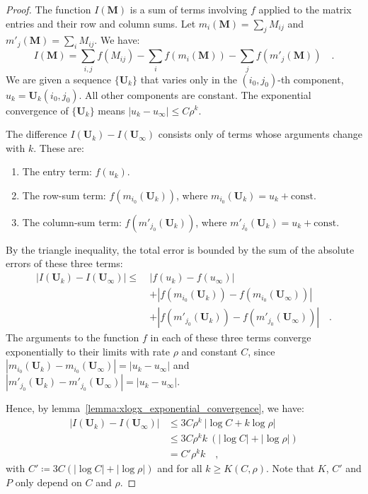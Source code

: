 \documentclass[../../main.tex]{subfiles}
\begin{document}
\begin{proof}
The function $I(\bm{M})$ is a sum of terms involving $f$ applied to the matrix entries and their row and column sums. Let $m_i(\bm{M}) = \sum_j M_{ij}$ and $m'_j(\bm{M}) = \sum_i M_{ij}$. We have:
\[
    I(\bm{M}) = \sum_{i,j} f(M_{ij}) - \sum_i f(m_i(\bm{M})) - \sum_j f(m'_j(\bm{M})) \quad .
\]
We are given a sequence $\{\bm{U}_k\}$ that varies only in the $(i_0, j_0)$-th component, $u_k = \bm{U}_k(i_0, j_0)$. All other components are constant. The exponential convergence of $\{\bm{U}_k\}$ means $|u_k - u_\infty| \le C \rho^k$.

The difference $I(\bm{U}_k) - I(\bm{U}_\infty)$ consists only of terms whose arguments change with $k$. These are:
\begin{enumerate}
    \item The entry term: $f(u_k)$.
    \item The row-sum term: $f(m_{i_0}(\bm{U}_k))$, where $m_{i_0}(\bm{U}_k) = u_k + \text{const}$.
    \item The column-sum term: $f(m'_{j_0}(\bm{U}_k))$, where $m'_{j_0}(\bm{U}_k) = u_k + \text{const}$.
\end{enumerate}
By the triangle inequality, the total error is bounded by the sum of the absolute errors of these three terms:
\begin{align*}
|I(\bm{U}_k) - I(\bm{U}_\infty)| \le \ & |f(u_k) - f(u_\infty)| \\
& + |f(m_{i_0}(\bm{U}_k)) - f(m_{i_0}(\bm{U}_\infty))| \\
& + |f(m'_{j_0}(\bm{U}_k)) - f(m'_{j_0}(\bm{U}_\infty))| \quad .
\end{align*}
The arguments to the function $f$ in each of these three terms converge exponentially to their limits with rate $\rho$ and constant $C$, since $|m_{i_0}(\bm{U}_k) - m_{i_0}(\bm{U}_\infty)| = |u_k - u_\infty|$ and $|m'_{j_0}(\bm{U}_k) - m'_{j_0}(\bm{U}_\infty)| = |u_k - u_\infty|$.

Hence, by lemma~\ref{lemma:xlogx_exponential_convergence}, we have:
\begin{align*}
|I(\bm{U}_k) - I(\bm{U}_\infty)| &\leq 3 C \rho^k \ |\log C + k \log \rho| \\
&\leq 3 C \rho^k k \ (|\log C| + |\log \rho|) \\
&= C' \rho^k k \quad ,
\end{align*}
with $C' \coloneqq 3 C (|\log C| + |\log \rho|)$ and for all $k \geq K(C, \rho)$. Note that $K$, $C'$ and $P$ only depend on $C$ and $\rho$.
\end{proof}
\end{document}
